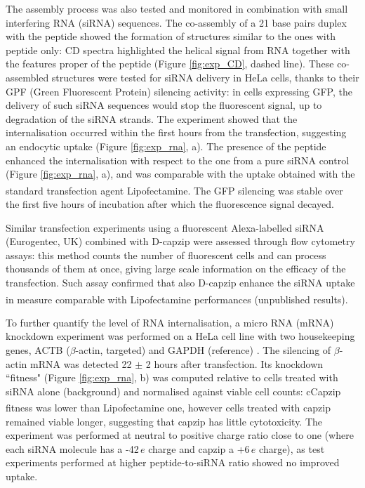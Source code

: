 The assembly process was also tested and monitored in combination with small interfering RNA (siRNA) sequences. The co-assembly of a 21 base pairs duplex with the peptide showed the formation of structures similar to the ones with peptide only: CD spectra highlighted the helical signal from RNA together with the features proper of the peptide (Figure \ref{fig:exp_CD}, dashed line).
%
These co-assembled structures were tested for siRNA delivery in HeLa cells, thanks to their GPF (Green Fluorescent Protein) silencing activity: in cells expressing GFP, the delivery of such siRNA sequences would stop the fluorescent signal, up to degradation of the siRNA strands. The experiment showed that the internalisation occurred within the first hours from the transfection, suggesting an endocytic uptake (Figure \ref{fig:exp_rna}, a). The presence of the peptide enhanced the internalisation with respect to the one from a pure siRNA control (Figure \ref{fig:exp_rna}, a), and was comparable with the uptake obtained with the standard transfection agent Lipofectamine\textsuperscript{\textregistered}.
%
The GFP silencing was stable over the first five hours of incubation after which the fluorescence signal decayed. 

Similar transfection experiments using a fluorescent Alexa-labelled siRNA (Eurogentec, UK) combined with D-capzip were assessed through flow cytometry assays: this method counts the number of fluorescent cells and can process thousands of them at once, giving large scale information on the efficacy of the transfection. Such assay confirmed that also D-capzip enhance the siRNA uptake in measure comparable with Lipofectamine\textsuperscript{\textregistered} performances (unpublished results).

To further quantify the level of RNA internalisation, a micro RNA (mRNA) knockdown experiment was performed on a HeLa cell line with two housekeeping genes, ACTB ($\beta$-actin, targeted) and GAPDH (reference) \citep{Crombez2009}.
%
The silencing of $\beta$-actin mRNA was detected 22 $\pm$ 2 hours after transfection. Its knockdown ``fitness" (Figure \ref{fig:exp_rna}, b) was computed relative to cells treated with siRNA alone (background) and normalised against viable cell counts: cCapzip fitness was lower than Lipofectamine\textsuperscript{\textregistered} one, however cells treated with capzip remained viable longer, suggesting that capzip has little cytotoxicity.
%
The experiment was performed at neutral to positive charge ratio close to one (where each siRNA molecule has a -42$\, e$ charge and capzip a +6$\, e$ charge), as test experiments performed at higher peptide-to-siRNA ratio showed no improved uptake.

